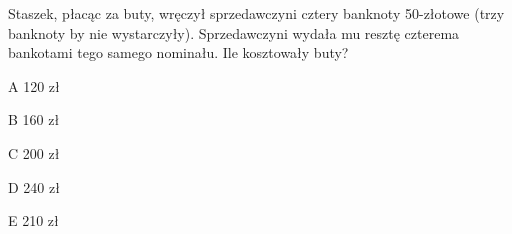 \begin{tresc}
Staszek, płacąc za buty, wręczył sprzedawczyni cztery banknoty 50-złotowe (trzy banknoty by nie wystarczyły). Sprzedawczyni wydała mu resztę czterema bankotami tego samego nominału. Ile kosztowały buty?
\end{tresc}
\begin{wariant}{A} 120 zł \end{wariant}
\begin{wariant}{B} 160 zł \end{wariant}
\begin{wariant}{C} 200 zł \end{wariant}
\begin{wariant}{D} 240 zł \end{wariant}
\begin{wariant}{E} 210 zł \end{wariant}
